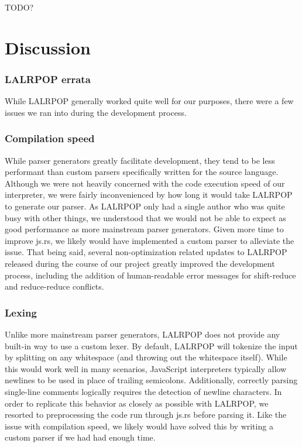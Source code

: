 \documentclass{article}
\begin{document}
\begin{multicols}{2}
TODO?

\section{Discussion}

\subsubsection*{LALRPOP errata}

While LALRPOP generally worked quite well for our purposes, there were a few
issues we ran into during the development process.

\subsubsection*{Compilation speed}

While parser generators greatly facilitate development, they tend to be less
performant than custom parsers specifically written for the source language.
Although we were not heavily concerned with the code execution speed of our
interpreter, we were fairly inconvenienced by how long it would take LALRPOP to
generate our parser. As LALRPOP only had a single author who was quite busy with
other things, we understood that we would not be able to expect as good
performance as more mainstream parser generators. Given more time to improve
js.rs, we likely would have implemented a custom parser to alleviate the issue.
That being said, several non-optimization related updates to LALRPOP released
during the course of our project greatly improved the development process,
including the addition of human-readable error messages for shift-reduce and
reduce-reduce conflicts.

\subsubsection*{Lexing}

Unlike more mainstream parser generators, LALRPOP does not provide any built-in
way to use a custom lexer. By default, LALRPOP will tokenize the input by
splitting on any whitespace (and throwing out the whitespace itself). While this
would work well in many scenarios, JavaScript interpreters typically allow
newlines to be used in place of trailing semicolons. Additionally, correctly
parsing single-line comments logically requires the detection of newline
characters. In order to replicate this behavior as closely as possible with
LALRPOP, we resorted to preprocessing the code run through js.rs before parsing
it. Like the issue with compilation speed, we likely would have solved this by
writing a custom parser if we had had enough time.


\end{multicols}
\end{document}
